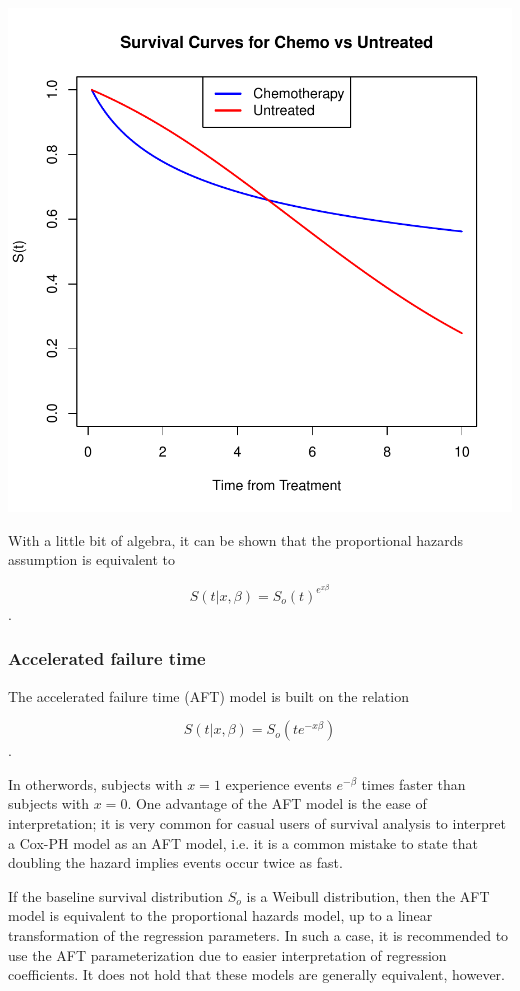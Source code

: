 \documentclass[a4paper]{article}
\begin{document}
    
\includegraphics{StatisticalBackground-007}

  With a little bit of algebra, it can be shown that the proportional hazards assumption is equivalent to 
  
\[
  S(t| x, \beta) = S_o(t)^{e^{x \beta}}
\].

    \subsubsection{Accelerated failure time}
   
   The accelerated failure time (AFT) model is built on the relation
   
   \[
   S(t | x, \beta) = S_o(t e^{-x \beta})
   \].

    In otherwords, subjects with $x = 1$ experience events $e^{-\beta}$ times faster than subjects with $x = 0$. One advantage of the AFT model is the ease of interpretation; it is very common for casual users of survival analysis to interpret a Cox-PH model as an AFT model, i.e. it is a common mistake to state that doubling the hazard implies events occur twice as fast. 
    
    If the baseline survival distribution $S_o$ is a Weibull distribution, then the AFT model is equivalent to the proportional hazards model, up to a linear transformation of the regression parameters. In such a case, it is recommended to use the AFT parameterization due to easier interpretation of regression coefficients. It does not hold that these models are generally equivalent, however. 
    
\end{document}

